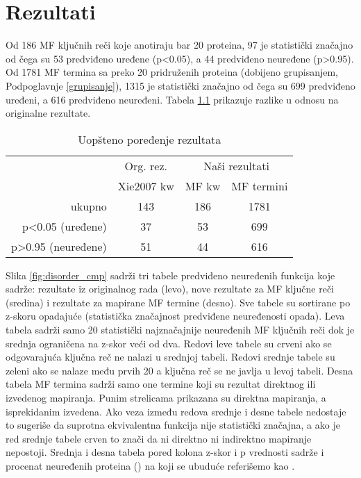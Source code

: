 
\chapter{Rezultati} %

\label{Rezultati} %

Od 186 MF ključnih reči koje anotiraju bar 20 proteina, 97 je statistički
značajno od čega su 53 predviđeno uređene (p<0.05), a 44 predviđeno neuređene
(p>0.95).  Od 1781 MF termina sa preko 20 pridruženih proteina (dobijeno
grupisanjem, Podpoglavnje \ref{grupisanje}), 1315 je statistički značajno od
čega su 699 predviđeno uređeni, a 616 predviđeno neuređeni.  Tabela
\ref{tab:kw_uopsteno} prikazuje razlike u odnosu na originalne rezultate.

\begin{table}[htpb]
\begin{tabular}{|r|c|c|c|}
  \hline
                     & Org. rez.  & \multicolumn{2}{c|}{ Naši rezultati} \\
                     & Xie2007 kw & MF kw  & MF termini                  \\
  \hline
  ukupno             & 143        & 186    & 1781                        \\
  p<0.05 (uređene)   & 37         & 53     & 699                         \\
  p>0.95 (neuređene) & 51         & 44     & 616                         \\
  \hline
\end{tabular}
  \centering
  \caption{Uopšteno poređenje rezultata}
  \label{tab:kw_uopsteno}
\end{table}

Slika \ref{fig:disorder_cmp} sadrži tri tabele predviđeno neuređenih funkcija
koje sadrže: rezultate iz originalnog rada \cite{Xie2007} (levo), nove
rezultate za MF ključne reči (sredina) i rezultate za mapirane MF termine
(desno). Sve tabele su sortirane po z-skoru opadajuće (statistička značajnost
predviđene neuređenosti opada).  Leva tabela sadrži samo 20 statistički najznačajnije
neuređenih MF ključnih reči dok je srednja ograničena na z-skor veći od dva.
Redovi leve tabele su crveni ako se odgovarajuća ključna reč ne nalazi u
srednjoj tabeli.  Redovi srednje tabele su zeleni ako se nalaze među prvih 20 a
ključna reč se ne javlja u levoj tabeli.  Desna tabela MF termina sadrži samo
one termine koji su rezultat direktnog ili izvedenog mapiranja.  Punim
strelicama prikazana su direktna mapiranja, a isprekidanim izvedena.  Ako veza
između redova srednje i desne tabele nedostaje to sugeriše da suprotna
ekvivalentna funkcija nije statistički značajna, a ako je red srednje tabele
crven to znači da ni direktno ni indirektno mapiranje nepostoji.  Srednja i
desna tabela pored kolona z-skor i p vrednosti sadrže i procenat neuređenih
proteina () na koji se ubuduće referišemo kao
.  

